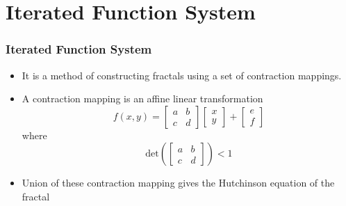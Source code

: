 \documentclass{beamer}
\begin{document}
\section{Iterated Function System}
\begin{frame}
    \frametitle{Iterated Function System}
    \begin{itemize}
        \item It is a method of constructing fractals using a set of contraction mappings. 
        \item A contraction mapping is an affine linear transformation 
        \begin{equation*}
            f(x, y)=\left[ \begin{array}{ll}{a} & {b} \\ {c} & {d}\end{array}\right] \left[ \begin{array}{l}{x} \\ {y}\end{array}\right]+\left[ \begin{array}{l}{e} \\ {f}\end{array}\right]
        \end{equation*}
        where
        \begin{equation*}
            \text{det}\left(\left[ \begin{array}{ll}{a} & {b} \\ {c} & {d}\end{array}\right]\right) < 1
        \end{equation*}
        \item Union of these contraction mapping gives the Hutchinson equation of the fractal
    \end{itemize}
\end{frame}

\end{document}

